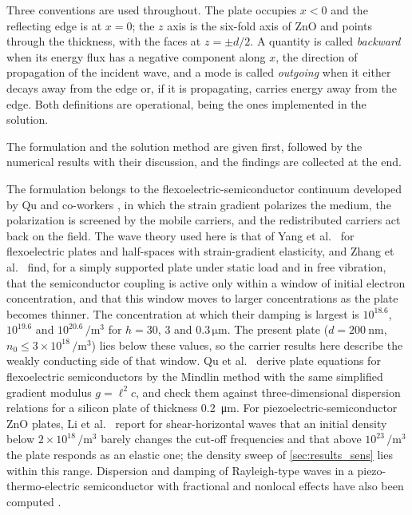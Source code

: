 \label{sec:intro_scope}

Three conventions are used throughout.  The plate
occupies $x<0$ and the reflecting edge is at $x=0$; the $z$ axis is the
six-fold axis of ZnO and points through the thickness, with the faces at
$z=\pm d/2$.  A quantity is called \emph{backward} when its energy flux has a
negative component along $x$, the direction of propagation of the incident wave, and a mode is called \emph{outgoing} when it either decays away
from the edge or, if it is propagating, carries energy away from the edge.  Both
definitions are operational, being the ones implemented in the solution.

The formulation and the solution method are given first, followed by the numerical results with their discussion, and the findings are collected at the end.

The formulation belongs to the flexoelectric-semiconductor continuum developed
by Qu and co-workers \cite{qu2020mobile,qu2022thermal}, in which the strain
gradient polarizes the medium, the polarization is screened by the mobile
carriers, and the redistributed carriers act back on the field.  The wave theory used here is that of Yang et al.\ \cite{yang2018lamb,yang2020rayleigh}
for flexoelectric plates and half-spaces with strain-gradient elasticity, and Zhang et al.\ \cite{zhang2025pscplate} find, for a simply supported plate under static load and in free vibration, that the semiconductor coupling is active only within a window of initial electron concentration, and that this window moves to larger concentrations as the plate becomes thinner.  The concentration at which their damping is largest is $10^{18.6}$, $10^{19.6}$ and $10^{20.6}\,\si{\per\cubic\metre}$ for $h=30$, $3$ and $0.3\,\si{\micro\metre}$.  The present plate ($d=\SI{200}{\nano\metre}$, $n_0\le3\times10^{18}\,\si{\per\cubic\metre}$) lies below these values, so the carrier results here describe the weakly conducting side of that window.  Qu et al.\ \cite{qu2023drag} derive plate equations for flexoelectric semiconductors by the Mindlin method with the same simplified gradient modulus $g=\ell^2c$, and check them against three-dimensional dispersion relations for a silicon plate of thickness \SI{0.2}{\micro\metre}.  For piezoelectric-semiconductor ZnO plates, Li et al.\ \cite{li2023sh} report for shear-horizontal waves that an initial density below $2\times10^{18}\,\si{\per\cubic\metre}$ barely changes the cut-off frequencies and that above $10^{23}\,\si{\per\cubic\metre}$ the plate responds as an elastic one; the density sweep of \cref{sec:results_sens} lies within this range.  Dispersion and damping of Rayleigh-type waves in a piezo-thermo-electric semiconductor with fractional and nonlocal effects have also been computed \cite{aldandani2026kg}.

